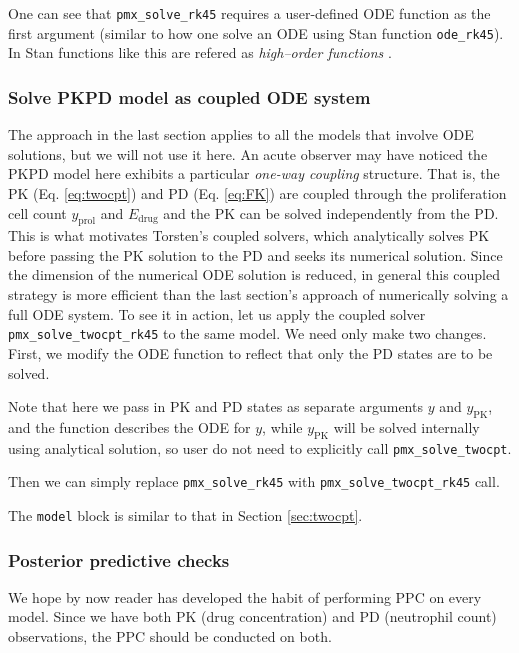 One can see that \texttt{pmx\_solve\_rk45}
requires a user-defined ODE function as the first argument (similar to
how one solve an ODE using Stan function
\texttt{ode\_rk45}). In Stan functions like this are refered as
\emph{high--order functions} \cite[Chapter 9]{Stan:2021}.

\subsubsection{Solve PKPD model as coupled ODE system}
The approach in the last section applies to all the models that involve
ODE solutions, but we will not use it here. An acute
observer may have noticed the PKPD model here exhibits a particular
\emph{one-way coupling} structure.
That is, the PK (Eq. \eqref{eq:twocpt})
and PD (Eq. \eqref{eq:FK}) are
coupled through the proliferation cell count
$y_{\text{prol}}$ and $E_{\text{drug}}$ and the PK 
can be solved independently from the PD. This is what motivates Torsten's coupled solvers,
which analytically solves PK before
passing the PK solution to the PD and seeks its numerical
solution. Since the dimension of the numerical ODE solution is reduced, in general this coupled strategy is more efficient than
the last section's approach of numerically solving a full ODE system.
To see it in action, let us apply the
coupled solver \texttt{pmx\_solve\_twocpt\_rk45} \cite[Section 3.5]{Torsten:2021} to the same model. We need only make two changes. First, we
modify the ODE function to reflect that only the PD states are to be solved.


Note that here we pass in PK and PD states as separate arguments $y$
and $y_{\text{PK}}$, and the function describes the ODE for $y$, while
$y_{\text{PK}}$ will be solved internally using analytical solution,
so user do not need to explicitly call \texttt{pmx\_solve\_twocpt}.

Then we can simply replace \texttt{pmx\_solve\_rk45} with
\texttt{pmx\_solve\_twocpt\_rk45} call.


The \texttt{model} block is similar to that in Section \ref{sec:twocpt}.


\subsubsection{Posterior predictive checks}
We hope by now reader has developed the habit of performing
PPC on every model. Since we have both PK (drug
concentration) and PD (neutrophil count) observations, the PPC should
be conducted on both.


